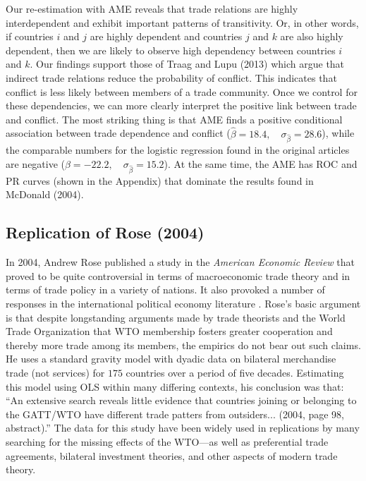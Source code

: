 Our re-estimation with AME reveals that trade relations are highly interdependent and exhibit important patterns of transitivity.  Or, in other words, if countries $i$ and $j$ are highly dependent and countries $j$ and $k$ are also highly dependent, then we are likely to observe high dependency between countries $i$ and $k$. Our findings support those of Traag and Lupu (2013) which argue that indirect trade relations reduce the probability of conflict. This indicates that conflict is less likely between members of a trade community. Once we control for these dependencies, we can more clearly interpret the positive link between trade and conflict.  The most striking thing is that AME finds a positive conditional association between trade dependence and conflict ($\hat{\beta}= 18.4, \quad \sigma_{\hat{\beta}} = 28.6$), while the comparable numbers for the logistic regression found in the original articles are negative ($\hat{\beta}= -22.2, \quad \sigma_{\hat{\beta}} = 15.2$). 
At the same time, the AME has ROC and PR curves (shown in the Appendix) that dominate the results found in McDonald (2004).

\subsection{Replication of Rose (2004)}

In 2004, Andrew Rose published a study in the \textit{American Economic Review} \nocite{rose:2004} that proved to be quite controversial in terms of macroeconomic trade theory and in terms of trade policy in a variety of nations. It also provoked a number of responses in the international political economy literature \cite{tomz:etal:2007,ward:etal:2013}.  Rose's basic argument is that despite longstanding arguments made by trade theorists and the World Trade Organization that WTO membership fosters greater cooperation and thereby more trade among its members, the empirics do not bear out such claims. He uses a standard gravity model with dyadic data on bilateral merchandise trade (not services) for $175$ countries over a period of five decades. Estimating this model using OLS within many differing contexts, his conclusion was that: ``An extensive search reveals little evidence that countries joining or belonging to the GATT/WTO have different trade patters from outsiders... (2004, page 98, abstract).''  The data for this study have been widely used in replications by many searching for the missing effects of the WTO---as well as preferential trade agreements, bilateral investment theories, and other aspects of modern trade theory.  

